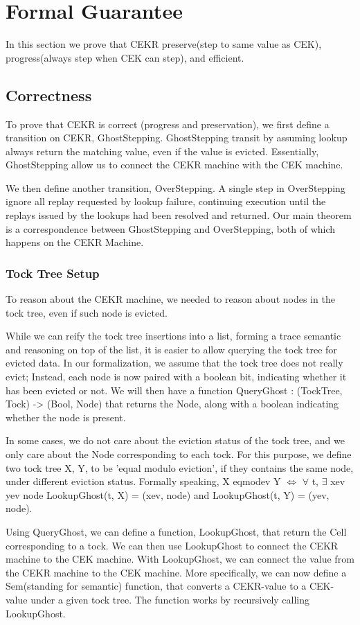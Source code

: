 \section{Formal Guarantee}
In this section we prove that CEKR preserve(step to same value as CEK), progress(always step when CEK can step), and efficient. 
\subsection{Correctness}
To prove that CEKR is correct (progress and preservation), we first define a transition on CEKR, GhostStepping. GhostStepping transit by assuming lookup always return the matching value, even if the value is evicted. Essentially, GhostStepping allow us to connect the CEKR machine with the CEK machine. 

We then define another transition, OverStepping. A single step in OverStepping ignore all replay requested by lookup failure, continuing execution until the replays issued by the lookups had been resolved and returned. Our main theorem is a correspondence between GhostStepping and OverStepping, both of which happens on the CEKR Machine.

\subsubsection{Tock Tree Setup}
To reason about the CEKR machine, we needed to reason about nodes in the tock tree, even if such node is evicted.

While we can reify the tock tree insertions into a list, forming a trace semantic and reasoning on top of the list, it is easier to allow querying the tock tree for evicted data. In our formalization, we assume that the tock tree does not really evict; Instead, each node is now paired with a boolean bit, indicating whether it has been evicted or not. We will then have a function QueryGhost : (TockTree, Tock) -> (Bool, Node) that returns the Node, along with a boolean indicating whether the node is present.

In some cases, we do not care about the eviction status of the tock tree, and we only care about the Node corresponding to each tock. For this purpose, we define two tock tree X, Y, to be 'equal modulo eviction', if they contains the same node, under different eviction status. Formally speaking, X eqmodev Y $\iff$ $\forall$ t, $\exists$ xev yev node LookupGhost(t, X) = (xev, node) and LookupGhost(t, Y) = (yev, node).

Using QueryGhost, we can define a function, LookupGhost, that return the Cell corresponding to a tock. We can then use LookupGhost to connect the CEKR machine to the CEK machine. With LookupGhost, we can connect the value from the CEKR machine to the CEK machine. More specifically, we can now define a Sem(standing for semantic) function, that converts a CEKR-value to a CEK-value under a given tock tree. The function works by recursively calling LookupGhost.

